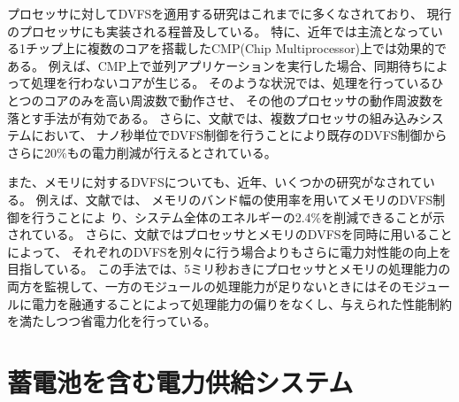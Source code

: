 プロセッサに対してDVFSを適用する研究はこれまでに多くなされており、
現行のプロセッサにも実装される程普及している。
特に、近年では主流となっている1チップ上に複数のコアを搭載したCMP(Chip Multiprocessor)上では効果的である。
例えば、CMP上で並列アプリケーションを実行した場合、同期待ちによって処理を行わないコアが生じる。
そのような状況では、処理を行っているひとつのコアのみを高い周波数で動作させ、
その他のプロセッサの動作周波数を落とす手法が有効である。
さらに、文献\cite{4658633}では、複数プロセッサの組み込みシステムにおいて、
ナノ秒単位でDVFS制御を行うことにより既存のDVFS制御からさらに20\%もの電力削減が行えるとされている。


また、メモリに対するDVFSについても、近年、いくつかの研究がなされている。
例えば、文献\cite{David:2011:MPM:1998582.1998590}では、
メモリのバンド幅の使用率を用いてメモリのDVFS制御を行うことによ
り、システム全体のエネルギーの2.4\%を削減できることが示されている。
さらに、文献\cite{6493615}ではプロセッサとメモリのDVFSを同時に用いることによって、
それぞれのDVFSを別々に行う場合よりもさらに電力対性能の向上を目指している。
この手法では、5ミリ秒おきにプロセッサとメモリの処理能力の両方を監視して、一方のモジュールの処理能力が足りないときにはそのモジュールに電力を融通することによって処理能力の偏りをなくし、与えられた性能制約を満たしつつ省電力化を行っている。










\section{蓄電池を含む電力供給システム}
\label{sec:ups}

